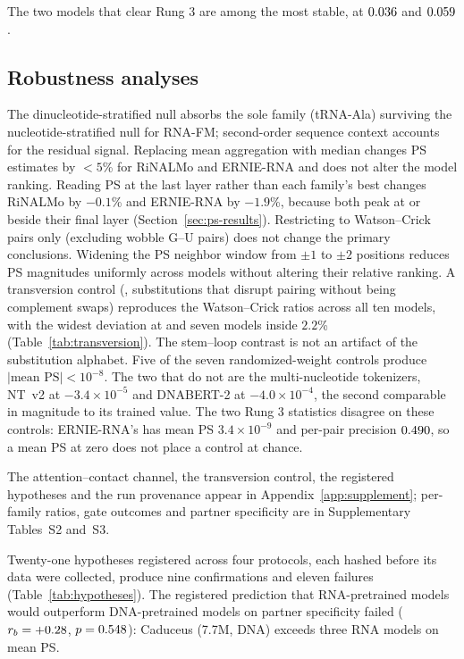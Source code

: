 \documentclass[11pt]{article}
\begin{document}
The two models that clear Rung 3 are among the most stable, at $0.036{}$
and $0.059{}$.

\subsection{Robustness analyses}
\label{sec:robustness}

The dinucleotide-stratified null absorbs the sole family (tRNA-Ala)
surviving the nucleotide-stratified null for RNA-FM; second-order sequence
context accounts for the residual signal. Replacing
mean aggregation with median changes PS estimates by $< 5$\% for RiNALMo
and ERNIE-RNA and does not alter the model ranking. Reading PS at the last
layer rather than each family's best changes RiNALMo by $-0.1$\% and ERNIE-RNA
by $-1.9$\%, because both peak at or beside their final layer
(Section~\ref{sec:ps-results}). Restricting to Watson--Crick pairs only (excluding wobble G--U
pairs) does not change the primary conclusions. Widening the PS neighbor
window from $\pm 1$ to $\pm 2$ positions reduces PS magnitudes uniformly
across models without altering their relative ranking.
A transversion control (\transversionAlphabet{}, substitutions that disrupt
pairing without being complement swaps) reproduces the Watson--Crick ratios
across all ten models, with the widest deviation \transversionWidestDeviation{}
at \transversionWidest{} and seven models inside $2.2$\%
(Table~\ref{tab:transversion}). The stem--loop contrast is not an artifact of
the substitution alphabet. Five of the seven randomized-weight
controls produce $|\text{mean PS}| < 10^{-8}$. The two that do not are the
multi-nucleotide tokenizers, NT~v2 at $-3.4 \times 10^{-5}$ and DNABERT-2 at
$-4.0 \times 10^{-4}$, the second comparable in magnitude to its trained value.
The two Rung 3 statistics disagree on these controls: ERNIE-RNA's has mean PS
$3.4 \times 10^{-9}$ and per-pair precision
$0.490{}$, so a mean PS at zero does
not place a control at chance.

The attention--contact channel, the transversion control, the registered
hypotheses and the run provenance appear in Appendix~\ref{app:supplement};
per-family ratios, gate outcomes and partner specificity are in Supplementary
Tables~S2 and~S3.


Twenty-one hypotheses registered across four protocols, each hashed before its
data were collected, produce nine confirmations and eleven failures
(Table~\ref{tab:hypotheses}). The registered prediction that RNA-pretrained
models would outperform DNA-pretrained models on partner specificity failed
($r_b = +0.28{}$, $p = 0.548{}$): Caduceus (7.7M, DNA) exceeds
three RNA models on mean PS.
\end{document}
